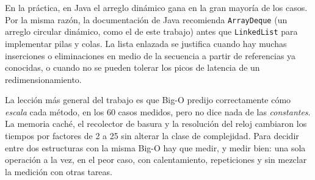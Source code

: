 \documentclass[11pt,a4paper]{article}
\begin{document}
En la práctica, en Java el arreglo dinámico gana en la gran mayoría de los casos. Por la misma razón,
la documentación de Java recomienda \texttt{ArrayDeque} (un arreglo circular dinámico, como el de este
trabajo) antes que \texttt{LinkedList} para implementar pilas y colas. La lista enlazada se justifica
cuando hay muchas inserciones o eliminaciones en medio de la secuencia a partir de referencias ya
conocidas, o cuando no se pueden tolerar los picos de latencia de un redimensionamiento.

La lección más general del trabajo es que Big-O predijo correctamente cómo \emph{escala} cada
método, en los 60 casos medidos, pero no dice nada de las \emph{constantes}. La memoria caché, el
recolector de basura y la resolución del reloj cambiaron los tiempos por factores de 2 a 25 sin alterar
la clase de complejidad. Para decidir entre dos estructuras con la misma Big-O hay que medir, y medir
bien: una sola operación a la vez, en el peor caso, con calentamiento, repeticiones y sin mezclar la
medición con otras tareas.
\end{document}
